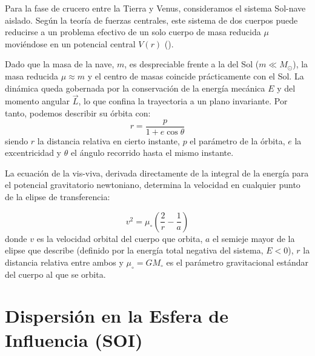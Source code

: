 \documentclass{article}
\begin{document}
Para la fase de crucero entre la Tierra y Venus, consideramos el sistema Sol-nave aislado. Según la teoría de fuerzas centrales, este sistema de dos cuerpos puede reducirse a un problema efectivo de un solo cuerpo de masa reducida $\mu$ moviéndose en un potencial central $V(r)$ (\cite{teoria_mecanica}).

Dado que la masa de la nave, $m$, es despreciable frente a la del Sol ($m \ll M_{\odot}$), la masa reducida $\mu \approx m$ y el centro de masas coincide prácticamente con el Sol. La dinámica queda gobernada por la conservación de la energía mecánica $E$ y del momento angular $\vec{L}$, lo que confina la trayectoria a un plano invariante.
Por tanto, podemos describir su órbita con:
\begin{equation}\label{eq:1ecos}
    r = \frac{p}{1+e\cos\theta}
\end{equation}
siendo $r$ la distancia relativa en cierto instante, $p$ el parámetro 
de la órbita, 
$e$ la excentricidad y $\theta$ el ángulo recorrido hasta el mismo instante.

La ecuación de la vis-viva, derivada directamente de la integral de la energía para el potencial gravitatorio newtoniano, determina la velocidad en cualquier punto de la elipse de transferencia:

\begin{equation}\label{eq:viva}
    v^2 = \mu_\circ \left( \frac{2}{r} - \frac{1}{a} \right)
\end{equation}
donde $v$ es la velocidad orbital del cuerpo que orbita, $a$ el semieje mayor de la elipse que describe (definido por la energía total negativa del sistema, $E < 0$), $r$ la distancia relativa entre ambos y $\mu_\circ=GM_\circ$ es el parámetro gravitacional estándar del cuerpo al que se orbita.

\section{Dispersión en la Esfera de Influencia (SOI)}
\end{document}

